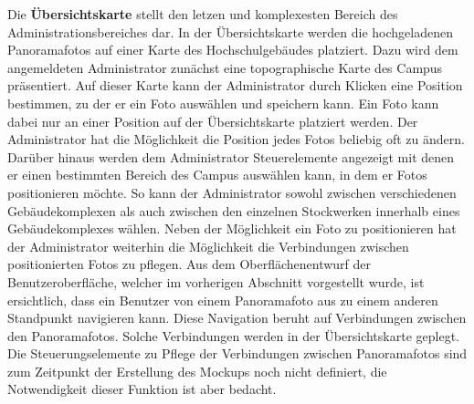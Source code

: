 Die \textbf{Übersichtskarte} stellt den letzen und komplexesten Bereich des
Administrationsbereiches dar. In der Übersichtskarte werden die hochgeladenen
Panoramafotos auf einer Karte des Hochschulgebäudes platziert. Dazu wird dem
angemeldeten Administrator zunächst eine topographische Karte des Campus
präsentiert. Auf dieser Karte kann der Administrator durch Klicken eine
Position bestimmen, zu der er ein Foto auswählen und speichern kann.
Ein Foto kann dabei nur an einer Position auf der Übersichtskarte platziert
werden. Der Administrator hat die Möglichkeit die Position jedes Fotos beliebig
oft zu ändern. Darüber hinaus werden dem Administrator Steuerelemente angezeigt
mit denen er einen bestimmten Bereich des Campus auswählen kann, in dem er
Fotos positionieren möchte. So kann der Administrator sowohl zwischen
verschiedenen Gebäudekomplexen als auch zwischen den einzelnen Stockwerken
innerhalb eines Gebäudekomplexes wählen. Neben der Möglichkeit ein Foto zu
positionieren hat der Administrator weiterhin die Möglichkeit die Verbindungen
zwischen positionierten Fotos zu pflegen. Aus dem Oberflächenentwurf der
Benutzeroberfläche, welcher im vorherigen Abschnitt vorgestellt wurde, ist
ersichtlich, dass ein Benutzer von einem Panoramafoto aus zu einem anderen
Standpunkt navigieren kann. Diese Navigation beruht auf Verbindungen zwischen
den Panoramafotos. Solche Verbindungen werden in der Übersichtskarte geplegt.
Die Steuerungselemente zu Pflege der Verbindungen zwischen Panoramafotos sind zum
Zeitpunkt der Erstellung des Mockups noch nicht definiert, die Notwendigkeit
dieser Funktion ist aber bedacht.